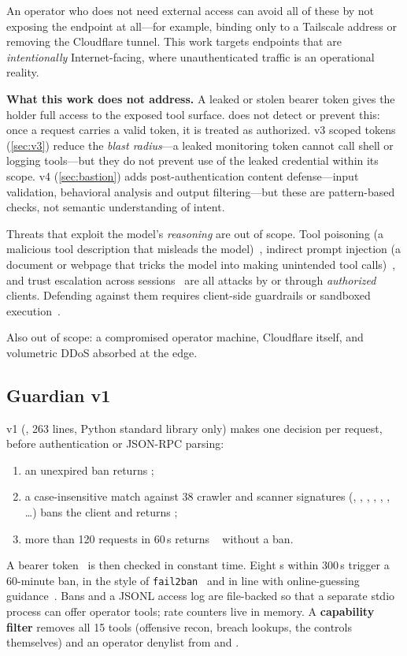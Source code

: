 \documentclass[10pt,twocolumn]{article}
\begin{document}
An operator who does not need external access can avoid all of these by not
exposing the endpoint at all---for example, binding only to a Tailscale
address or removing the Cloudflare tunnel. This work targets endpoints that
are \emph{intentionally} Internet-facing, where unauthenticated traffic is an
operational reality.

\smallskip\noindent\textbf{What this work does not address.}
A leaked or stolen bearer token gives the holder full access to the
exposed tool surface. \sys{} does not detect or prevent this: once a
request carries a valid token, it is treated as authorized.
v3 scoped tokens (\cref{sec:v3}) reduce the \emph{blast radius}---a leaked
monitoring token cannot call shell or logging tools---but they do not
prevent use of the leaked credential within its scope. v4 \bastion{}
(\cref{sec:bastion}) adds post-authentication content defense---input
validation, behavioral analysis and output filtering---but these are
pattern-based checks, not semantic understanding of intent.

Threats that exploit the model's \emph{reasoning} are out of scope.
Tool poisoning (a malicious tool description that misleads the
model)~\citep{mcptox2025}, indirect prompt injection (a document or webpage
that tricks the model into making unintended tool
calls)~\citep{greshake2023indirect}, and trust escalation across
sessions~\citep{trustshift2026} are all attacks by or through
\emph{authorized} clients. Defending against them requires client-side
guardrails or sandboxed execution~\citep{cascade2026,nsamcp2026}.

Also out of scope: a compromised operator machine, Cloudflare itself, and
volumetric DDoS absorbed at the edge.

\subsection{Guardian v1}
\sys{} v1 (, 263 lines, Python standard library only) makes
one decision per request, before authentication or JSON-RPC parsing:
\begin{enumerate}
\item an unexpired ban returns ;
\item a case-insensitive match against 38 crawler and scanner signatures
      (, , , ,
      , , \ldots) bans the client and returns
      ;
\item more than 120 requests in 60\,s returns ~\citep{rfc6585}
      without a ban.
\end{enumerate}
A bearer token~\citep{rfc6750} is then checked in constant time. Eight
s within 300\,s trigger a 60-minute ban, in the style of
\texttt{fail2ban}~\citep{fail2ban} and in line with online-guessing
guidance~\citep{nist80063b}. Bans and a JSONL access log are file-backed so
that a separate stdio process can offer operator tools; rate counters live in
memory. A \textbf{capability filter} removes all 15  tools
(offensive recon, breach lookups, the \sys{} controls themselves) and an
operator denylist from  and .
\end{document}
